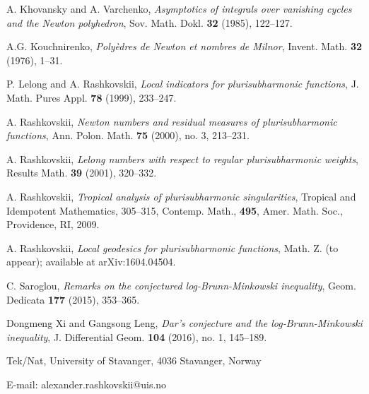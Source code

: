 \documentclass[12pt]{article}
\numberwithin{equation}{section}
\begin{document}
\begin{thebibliography}{19}
A. Khovansky and A. Varchenko, {\sl Asymptotics of integrals over vanishing cycles and the Newton polyhedron}, Sov. Math. Dokl. {\bf 32} (1985), 122--127.

{A.G. Kouchnirenko}, {\sl Poly\`edres de Newton et nombres de
Milnor}, Invent. Math. {\bf 32} (1976), 1--31.

{ P. Lelong and A. Rashkovskii}, {\sl Local indicators for
plurisubharmonic functions}, J. Math. Pures Appl. {\bf 78} (1999), 233--247.


{ A. Rashkovskii}, {\sl Newton numbers and residual measures of
  plurisubharmonic functions}, Ann. Polon. Math. {\bf 75} (2000),
no. 3, 213--231.

{ A. Rashkovskii}, {\sl Lelong numbers with respect to regular
plurisubharmonic weights}, Results Math. {\bf 39} (2001), 320--332.

{ A. Rashkovskii}, {\sl Tropical analysis of plurisubharmonic singularities}, Tropical and Idempotent Mathematics, 305--315, Contemp. Math., {\bf 495}, Amer. Math. Soc., Providence, RI, 2009.

{ A. Rashkovskii}, {\sl Local geodesics for plurisubharmonic functions}, Math. Z. (to appear); available at arXiv:1604.04504.

C. Saroglou, {\sl
Remarks on the conjectured log-Brunn-Minkowski inequality},
Geom. Dedicata {\bf 177} (2015), 353--365.

Dongmeng Xi and Gangsong Leng, {\sl Dar's conjecture and the log-Brunn-Minkowski inequality},
J. Differential Geom. {\bf 104} (2016), no. 1, 145--189.



\end{thebibliography}


\vskip1cm

Tek/Nat, University of Stavanger, 4036 Stavanger, Norway

\vskip0.1cm

{\sc E-mail}: alexander.rashkovskii@uis.no
\end{document}

